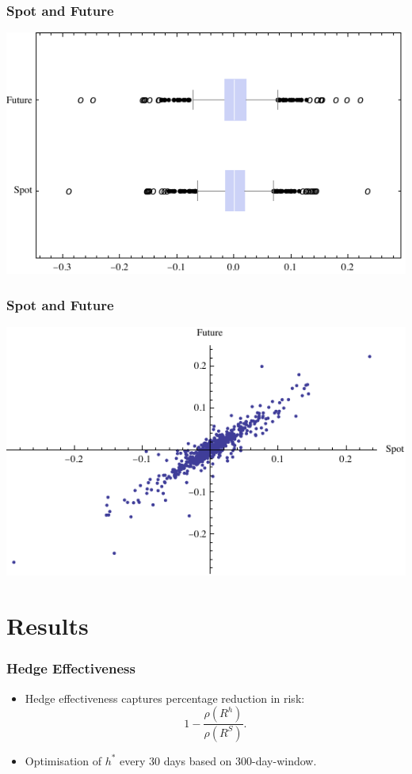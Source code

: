 \documentclass[10pt,mathserif,notes=show]{beamer}
\renewcommand{\(}{\begin{columns}}
\renewcommand{\)}{\end{columns}}
\newcommand{\<}[1]{\begin{column}{#1}}
\renewcommand{\>}{\end{column}}
\theoremstyle{definition}
\begin{document}
\begin{frame}
  \frametitle{Spot and Future}
  \begin{center}
    \includegraphics[scale=1]{../_pics/btc_future_box.pdf}
  \end{center}
\end{frame}

\begin{frame}
  \frametitle{Spot and Future}
  \begin{center}
    \includegraphics[scale=1]{../_pics/btc_future_scatter.pdf}
  \end{center}
\end{frame}

\section{Results}

\begin{frame}
  \frametitle{Hedge Effectiveness}
  \begin{itemize}
  \item Hedge effectiveness \citep{Ederington1979} captures percentage
    reduction in risk:
    \begin{equation*}
      1- \frac{\rho(R^h)}{\rho(R^S)}.
    \end{equation*}
  \item Optimisation of $h^\ast$ every 30 days based on
    300-day-window. 
  \end{itemize}
\end{frame}
\end{document}
